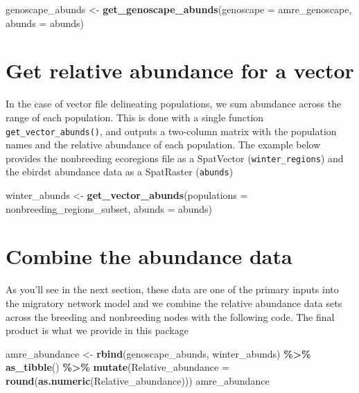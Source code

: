 \documentclass[
]{book}
\newenvironment{Shaded}{\begin{snugshade}}{\end{snugshade}}
\newcommand{\AttributeTok}[1]{\textcolor[rgb]{0.13,0.29,0.53}{#1}}
\newcommand{\FunctionTok}[1]{\textcolor[rgb]{0.13,0.29,0.53}{\textbf{#1}}}
\newcommand{\NormalTok}[1]{#1}
\newcommand{\OtherTok}[1]{\textcolor[rgb]{0.56,0.35,0.01}{#1}}
\newcommand{\SpecialCharTok}[1]{\textcolor[rgb]{0.81,0.36,0.00}{\textbf{#1}}}
\begin{document}
\begin{Shaded}
\begin{Highlighting}[]
\NormalTok{genoscape\_abunds }\OtherTok{\textless{}{-}} \FunctionTok{get\_genoscape\_abunds}\NormalTok{(}\AttributeTok{genoscape =}\NormalTok{ amre\_genoscape, }\AttributeTok{abunds =}\NormalTok{ abunds)}
\end{Highlighting}
\end{Shaded}

\hypertarget{get-relative-abundance-for-a-vector}{%
\section{Get relative abundance for a vector}\label{get-relative-abundance-for-a-vector}}

In the case of vector file delineating populations, we sum abundance across the range of each population. This is done with a single function \texttt{get\_vector\_abunds()}, and outputs a two-column matrix with the population names and the relative abundance of each population. The example below provides the nonbreeding ecoregions file as a SpatVector (\texttt{winter\_regions}) and the ebirdst abundance data as a SpatRaster (\texttt{abunds})

\begin{Shaded}
\begin{Highlighting}[]
\NormalTok{winter\_abunds }\OtherTok{\textless{}{-}} \FunctionTok{get\_vector\_abunds}\NormalTok{(}\AttributeTok{populations =}\NormalTok{ nonbreeding\_regions\_subset, }\AttributeTok{abunds =}\NormalTok{ abunds)}
\end{Highlighting}
\end{Shaded}

\hypertarget{combine-the-abundance-data}{%
\section{Combine the abundance data}\label{combine-the-abundance-data}}

As you'll see in the next section, these data are one of the primary inputs into the migratory network model and we combine the relative abundance data sets across the breeding and nonbreeding nodes with the following code. The final product is what we provide in this package

\begin{Shaded}
\begin{Highlighting}[]
\NormalTok{amre\_abundance }\OtherTok{\textless{}{-}} \FunctionTok{rbind}\NormalTok{(genoscape\_abunds, winter\_abunds) }\SpecialCharTok{\%\textgreater{}\%}
  \FunctionTok{as\_tibble}\NormalTok{() }\SpecialCharTok{\%\textgreater{}\%}
  \FunctionTok{mutate}\NormalTok{(}\AttributeTok{Relative\_abundance =} \FunctionTok{round}\NormalTok{(}\FunctionTok{as.numeric}\NormalTok{(Relative\_abundance)))}
\NormalTok{amre\_abundance}
\end{Highlighting}
\end{Shaded}
\end{document}
